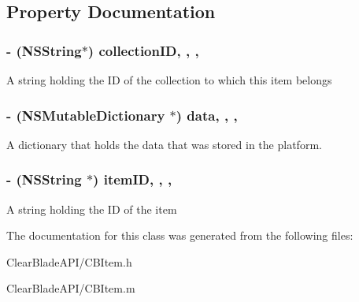 \subsection{Property Documentation}
\hypertarget{interface_c_b_item_a8d47dba1bcfeb0754b65d312a48a939a}{
\subsubsection[{collection\+I\+D}]{\setlength{\rightskip}{0pt plus 5cm}-\/ (N\+S\+String$\ast$) collection\+I\+D\hspace{0.3cm}{\ttfamily [read]}, {\ttfamily [write]}, {\ttfamily [nonatomic]}, {\ttfamily [strong]}}}\label{interface_c_b_item_a8d47dba1bcfeb0754b65d312a48a939a}
A string holding the I\+D of the collection to which this item belongs \hypertarget{interface_c_b_item_a056a3d35cb718cb306dc69915bec29e2}{
\subsubsection[{data}]{\setlength{\rightskip}{0pt plus 5cm}-\/ (N\+S\+Mutable\+Dictionary $\ast$) data\hspace{0.3cm}{\ttfamily [read]}, {\ttfamily [write]}, {\ttfamily [nonatomic]}, {\ttfamily [strong]}}}\label{interface_c_b_item_a056a3d35cb718cb306dc69915bec29e2}
A dictionary that holds the data that was stored in the platform. \hypertarget{interface_c_b_item_adc7d0932fa46e75354e7dbe63d714165}{
\subsubsection[{item\+I\+D}]{\setlength{\rightskip}{0pt plus 5cm}-\/ (N\+S\+String $\ast$) item\+I\+D\hspace{0.3cm}{\ttfamily [read]}, {\ttfamily [write]}, {\ttfamily [nonatomic]}, {\ttfamily [strong]}}}\label{interface_c_b_item_adc7d0932fa46e75354e7dbe63d714165}
A string holding the I\+D of the item 

The documentation for this class was generated from the following files\+:\begin{DoxyCompactItemize}
\item 
Clear\+Blade\+A\+P\+I/C\+B\+Item.\+h\item 
Clear\+Blade\+A\+P\+I/C\+B\+Item.\+m\end{DoxyCompactItemize}
